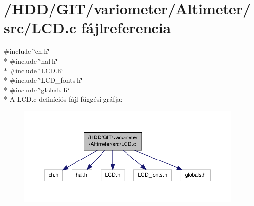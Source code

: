 \section{/\-H\-D\-D/\-G\-I\-T/variometer/\-Altimeter/src/\-L\-C\-D.c fájlreferencia}
\label{_l_c_d_8c}
{\ttfamily \#include \char`\"{}ch.\-h\char`\"{}}\\*
{\ttfamily \#include \char`\"{}hal.\-h\char`\"{}}\\*
{\ttfamily \#include \char`\"{}L\-C\-D.\-h\char`\"{}}\\*
{\ttfamily \#include \char`\"{}L\-C\-D\-\_\-fonts.\-h\char`\"{}}\\*
{\ttfamily \#include \char`\"{}globals.\-h\char`\"{}}\\*
A L\-C\-D.\-c definíciós fájl függési gráfja\-:
\nopagebreak
\begin{figure}[H]
\begin{center}
\leavevmode
\includegraphics[width=350pt]{_l_c_d_8c__incl}
\end{center}
\end{figure}
